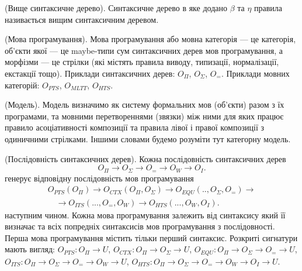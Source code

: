 \begin{definition} (Вище синтаксичне дерево).
Синтаксичне дерево в яке додано $\beta$ та $\eta$ правила називається
вищим синтаксичним деревом.
\end{definition}

\begin{definition} (Мова програмування).
Мова програмування або мовна категорія --- це категорія,
об’єкти якої --- це maybe-типи сум синтаксичних дерев мов програмування,
  а морфізми --- це стрілки (які містять правила виводу, типизації, нормалізації, екстакції тощо).
Приклади синтаксичних дерев: $O_\Pi$, $O_\Sigma$, $O_=$.
Приклади мовних категорій: $O_{PTS}$, $O_{MLTT}$, $O_{HTS}$.
\end{definition}

\begin{definition} (Модель).
Модель визначимо як систему формальних мов (об'єкти) разом з їх програмами,
та мовними перетвореннями (звязки) між ними для яких працює правило асоціативності
композиції та правила лівої і правої композиції з одиничними стрілками.
Іншими словами будемо розуміти тут категорну модель.
\end{definition}

\begin{definition} (Послідовність синтаксичних дерев). Кожна послідовність
синтаксичних дерев
\begin{equation}
O_\Pi \rightarrow O_\Sigma \rightarrow O_= \rightarrow O_W \rightarrow O_I.
\end{equation}
генерує відповідну послідовність мов програмування
\begin{equation}
\begin{split}
O_{PTS}(O_\Pi) \rightarrow O_{CTX}(O_\Pi,O_\Sigma) \rightarrow O_{EQU}(..,O_\Sigma,O_=) \rightarrow \\
 \quad \rightarrow O_{ITS}(...,O_=,O_W) \rightarrow O_{HTS}(...,O_W,O_I).
\end{split}
\end{equation}
наступним чином. Кожна мова програмування залежить
від синтаксису який її визначає
та всіх попредніх синтаксисів мов програмування з послідовності.
Перша мова програмування містить тільки перший синтаксис.
Розкриті сигнатури мають вигляд:
$O_{PTS}: O_\Pi \rightarrow U$,
$O_{CTX}: O_\Pi \rightarrow O_\Sigma \rightarrow U$,
$O_{EQU}: O_\Pi \rightarrow O_\Sigma \rightarrow O_= \rightarrow U$,
$O_{ITS}: O_\Pi \rightarrow O_\Sigma \rightarrow O_= \rightarrow O_W \rightarrow U$,
$O_{HTS}: O_\Pi \rightarrow O_\Sigma \rightarrow O_= \rightarrow O_W \rightarrow O_I \rightarrow U$.
\end{definition}

